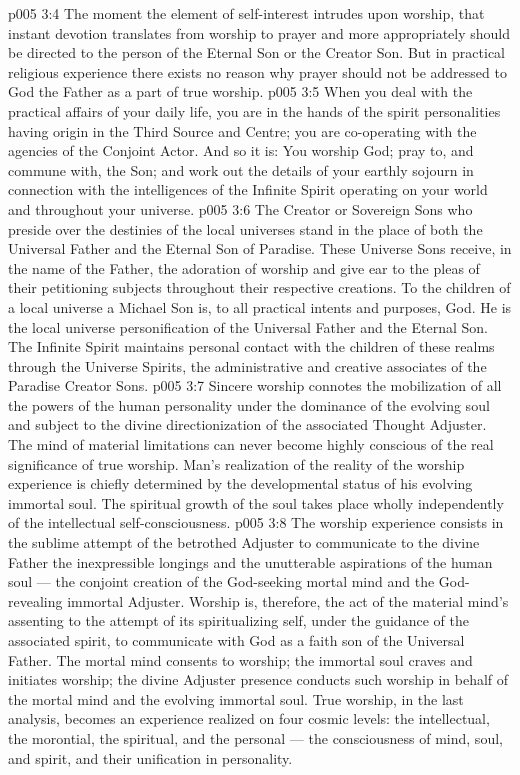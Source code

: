 \vs p005 3:4 The moment the element of self\hyp{}interest intrudes upon worship, that instant devotion translates from worship to prayer and more appropriately should be directed to the person of the Eternal Son or the Creator Son. But in practical religious experience there exists no reason why prayer should not be addressed to God the Father as a part of true worship.
\vs p005 3:5 When you deal with the practical affairs of your daily life, you are in the hands of the spirit personalities having origin in the Third Source and Centre; you are co\hyp{}operating with the agencies of the Conjoint Actor. And so it is: You worship God; pray to, and commune with, the Son; and work out the details of your earthly sojourn in connection with the intelligences of the Infinite Spirit operating on your world and throughout your universe.
\vs p005 3:6 \pc The Creator or Sovereign Sons who preside over the destinies of the local universes stand in the place of both the Universal Father and the Eternal Son of Paradise. These Universe Sons receive, in the name of the Father, the adoration of worship and give ear to the pleas of their petitioning subjects throughout their respective creations. To the children of a local universe a Michael Son is, to all practical intents and purposes, God. He is the local universe personification of the Universal Father and the Eternal Son. The Infinite Spirit maintains personal contact with the children of these realms through the Universe Spirits, the administrative and creative associates of the Paradise Creator Sons.
\vs p005 3:7 \pc Sincere worship connotes the mobilization of all the powers of the human personality under the dominance of the evolving soul and subject to the divine directionization of the associated Thought Adjuster. The mind of material limitations can never become highly conscious of the real significance of true worship. Man’s realization of the reality of the worship experience is chiefly determined by the developmental status of his evolving immortal soul. The spiritual growth of the soul takes place wholly independently of the intellectual self\hyp{}consciousness.
\vs p005 3:8 The worship experience consists in the sublime attempt of the betrothed Adjuster to communicate to the divine Father the inexpressible longings and the unutterable aspirations of the human soul --- the conjoint creation of the God\hyp{}seeking mortal mind and the God\hyp{}revealing immortal Adjuster. Worship is, therefore, the act of the material mind’s assenting to the attempt of its spiritualizing self, under the guidance of the associated spirit, to communicate with God as a faith son of the Universal Father. The mortal mind consents to worship; the immortal soul craves and initiates worship; the divine Adjuster presence conducts such worship in behalf of the mortal mind and the evolving immortal soul. True worship, in the last analysis, becomes an experience realized on four cosmic levels: the intellectual, the morontial, the spiritual, and the personal --- the consciousness of mind, soul, and spirit, and their unification in personality.
